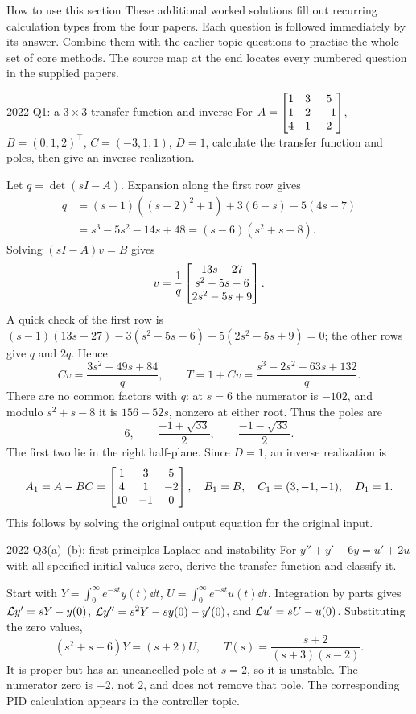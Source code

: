\begin{concept}{How to use this section}
These additional worked solutions fill out recurring calculation types from the four papers. Each question is followed immediately by its answer. Combine them with the earlier topic questions to practise the whole set of core methods. The source map at the end locates every numbered question in the supplied papers.
\end{concept}
\begin{question}{2022 Q1: a $3\times3$ transfer function and inverse}
For $A=\begin{bmatrix}1&3&5\\1&2&-1\\4&1&2\end{bmatrix}$, $B=(0,1,2)^{\top}$, $C=(-3,1,1)$, $D=1$, calculate the transfer function and poles, then give an inverse realization.
\end{question}
\begin{answer}
Let $q=\det(sI-A)$. Expansion along the first row gives
\begin{align*}
q&=(s-1)((s-2)^2+1)+3(6-s)-5(4s-7)\\
&=s^3-5s^2-14s+48=(s-6)(s^2+s-8).
\end{align*}
Solving $(sI-A)v=B$ gives
\[v=\frac1q\begin{bmatrix}13s-27\\s^2-5s-6\\2s^2-5s+9\end{bmatrix}.\]
A quick check of the first row is $(s-1)(13s-27)-3(s^2-5s-6)-5(2s^2-5s+9)=0$; the other rows give $q$ and $2q$. Hence
\[Cv=\frac{3s^2-49s+84}{q},\qquad T=1+Cv=\frac{s^3-2s^2-63s+132}{q}.\]
There are no common factors with $q$: at $s=6$ the numerator is $-102$, and modulo $s^2+s-8$ it is $156-52s$, nonzero at either root. Thus the poles are
\[6,\qquad\frac{-1+\sqrt{33}}2,\qquad\frac{-1-\sqrt{33}}2.\]
The first two lie in the right half-plane. Since $D=1$, an inverse realization is
\[A_1=A-BC=\begin{bmatrix}1&3&5\\4&1&-2\\10&-1&0\end{bmatrix},\quad B_1=B,\quad C_1=(3,-1,-1),\quad D_1=1.\]
This follows by solving the original output equation for the original input.
\end{answer}
\begin{question}{2022 Q3(a)--(b): first-principles Laplace and instability}
For $y''+y'-6y=u'+2u$ with all specified initial values zero, derive the transfer function and classify it.
\end{question}
\begin{answer}
Start with $Y=\int_0^\infty e^{-st}y(t)\dd t$, $U=\int_0^\infty e^{-st}u(t)\dd t$. Integration by parts gives $\mathcal L y'=sY-y(0)$, $\mathcal L y''=s^2Y-sy(0)-y'(0)$, and $\mathcal L u'=sU-u(0)$. Substituting the zero values,
\[(s^2+s-6)Y=(s+2)U,\qquad T(s)=\frac{s+2}{(s+3)(s-2)}.\]
It is proper but has an uncancelled pole at $s=2$, so it is unstable. The numerator zero is $-2$, not $2$, and does not remove that pole. The corresponding PID calculation appears in the controller topic.
\end{answer}
